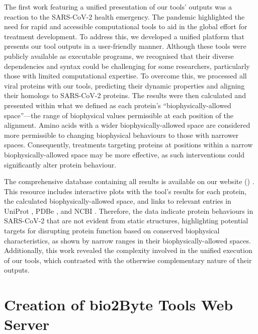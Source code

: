 The first work featuring a unified presentation of our tools' outputs was a reaction to the SARS-CoV-2 health emergency. The pandemic highlighted the need for rapid and accessible computational tools to aid in the global effort for treatment development. To address this, we developed a unified platform that presents our tool outputs in a user-friendly manner. Although these tools were publicly available as executable programs, we recognised that their diverse dependencies and syntax could be challenging for some researchers, particularly those with limited computational expertise. To overcome this, we processed all viral proteins with our tools, predicting their dynamic properties and aligning their homologs to SARS-CoV-2 proteins. The results were then calculated and presented within what we defined as each protein's ``biophysically-allowed space''---the range of biophysical values permissible at each position of the alignment. Amino acids with a wider biophysically-allowed space are considered more permissible to changing biophysical behaviours to those with narrower spaces. Consequently, treatments targeting proteins at positions within a narrow biophysically-allowed space may be more effective, as such interventions could significantly alter protein behaviour.

The comprehensive database containing all results is available on our website () \cite{kagami_online_2021}. This resource includes interactive plots with the tool's results for each protein, the calculated biophysically-allowed space, and links to relevant entries in UniProt \cite{the_uniprot_consortium_uniprot_2023}, PDBe \cite{armstrong_pdbe_2020}, and NCBI \cite{sayers_database_2021}. Therefore, the data indicate protein behaviours in SARS-CoV-2 that are not evident from static structures, highlighting potential targets for disrupting protein function based on conserved biophysical characteristics, as shown by narrow ranges in their biophysically-allowed spaces. Additionally, this work revealed the complexity involved in the unified execution of our tools, which contrasted with the otherwise complementary nature of their outputs.

\section{Creation of bio2Byte Tools Web Server}

